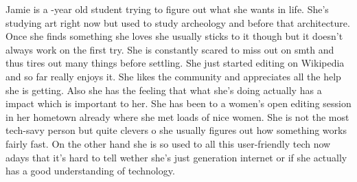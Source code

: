 \documentclass{article}
\begin{document}
Jamie is a -year old student trying to figure out what she wants in life. She's studying art right now but used to study archeology and before that architecture. Once she finds something she loves she usually sticks to it though but it doesn't always work on the first try. She is constantly scared to miss out on smth and thus tires out many things before settling. She just started editing on Wikipedia and so far really enjoys it. She likes the community and appreciates all the help she is getting. Also she has the feeling that what she's doing actually has a impact which is important to her. She has been to a women's open editing session in her hometown already where she met loads of nice women. She is not the most tech-savy person but quite clevers o she usually figures out how something works fairly fast. On the other hand she is so used to all this user-friendly tech now adays that it's hard to tell wether she's just generation internet or if she actually has a good understanding of technology.
\end{document}
